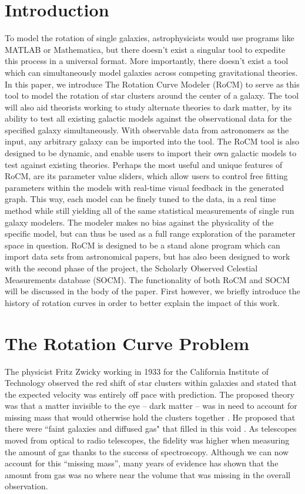 \documentclass[conference]{IEEEtran-modified}
\begin{document}
\section{Introduction}
To model the rotation of single galaxies, astrophysicists would use programs like MATLAB or Mathematica, but there doesn't exist a singular tool to expedite this process in a universal format.   More importantly, there doesn't exist a tool which can simultaneously model galaxies across competing gravitational theories.  In this paper, we introduce The Rotation Curve Modeler (RoCM) to serve as this tool to model the rotation of star clusters around the center of a galaxy. The tool will also aid theorists working to study alternate theories to dark matter, by its ability to test all existing galactic models against the observational data for the specified galaxy simultaneously. With observable data from astronomers as the input, any arbitrary galaxy can be imported into the tool. The RoCM tool is also designed to be dynamic, and enable users to import their own galactic models to test against existing theories.  Perhaps the most useful and unique features of RoCM, are its parameter value sliders, which allow users to control free fitting parameters within the models with real-time visual feedback in the generated graph. This way, each model can be finely tuned to the data, in a real time method while still yielding all of the same statistical measurements of single run galaxy modelers. The modeler makes no bias against the physicality of the specific model, but can thus be used as a full range exploration of the parameter space in question.  RoCM is designed to be a stand alone program which can import data sets from astronomical papers, but has also been designed to work with the second phase of the project, the Scholarly Observed Celestial Measurements database (SOCM). The functionality of both RoCM and SOCM will be discussed in the body of the paper.  First however, we briefly introduce the history of rotation curves in order to better explain the impact of this work.


\section{The Rotation Curve Problem}
The physicist Fritz Zwicky working in 1933 for the California Institute of Technology observed the red shift of star clusters within galaxies and stated that the expected velocity was entirely off pace with prediction. The proposed theory was that a matter invisible to the eye -- dark matter -- was in need to account for missing mass that would otherwise hold the clusters together \cite{zwicky}. He proposed that there were ``faint galaxies and diffused gas" that filled in this void \cite{zwicky}.  As telescopes moved from optical to radio telescopes, the fidelity was higher when measuring the amount of gas thanks to the success of spectroscopy.  Although we can now account for this ``missing mass'', many years of evidence has shown that the amount from gas was no where near the volume that was missing in the overall observation. 
\end{document}
